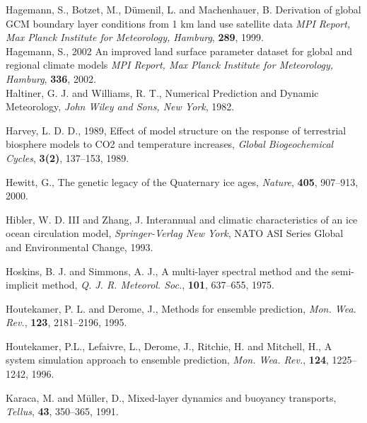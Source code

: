 \begin{thebibliography}{}
 Hagemann, S., Botzet, M., D\"umenil, L. and Machenhauer, B.
 Derivation of global GCM boundary layer conditions from 1 km land use
 satellite data
 {\em MPI Report, Max Planck Institute for Meteorology, Hamburg}, {\bf 289}, 1999.\\


 Hagemann, S., 2002
 An improved land surface parameter dataset for global and regional 
 climate models 
 {\em MPI Report, Max Planck Institute for Meteorology, Hamburg}, {\bf 336}, 2002.\\

 Haltiner, G. J. and Williams, R. T.,
 Numerical Prediction and Dynamic Meteorology,
 {\em John Wiley and Sons, New York}, 1982.

 Harvey, L. D. D., 1989, Effect of model structure on the response of
 terrestrial biosphere models to CO2 and temperature increases,
 {\it Global Biogeochemical Cycles}, {\bf 3(2)}, 137--153, 1989.

 Hewitt, G.,
 The genetic legacy of the Quaternary ice ages,
 {\em Nature}, {\bf 405}, 907--913, 2000.

 Hibler, W. D. III and Zhang, J.
 Interannual and climatic characteristics of an ice ocean
 circulation model,
 {\em Springer-Verlag New York},
 NATO ASI Series Global and Environmental Change, 1993.

 Hoskins, B. J. and Simmons, A. J.,
 A multi-layer spectral method and the semi-implicit method,
 {\em Q. J. R. Meteorol. Soc.}, {\bf 101}, 637--655, 1975.

 Houtekamer, P. L. and Derome, J., Methods for ensemble prediction,
 {\em Mon. Wea. Rev.}, {\bf 123}, 2181--2196, 1995.

 Houtekamer, P.L.,
 Lefaivre, L., Derome, J., Ritchie, H. and Mitchell, H., A system
 simulation approach to ensemble prediction, {\em Mon. Wea. Rev.},
 {\bf 124}, 1225--1242, 1996.

 Karaca, M. and M\"uller, D.,
 Mixed-layer dynamics and buoyancy transports,
 {\em Tellus}, {\bf 43}, 350--365, 1991.


\end{thebibliography}
